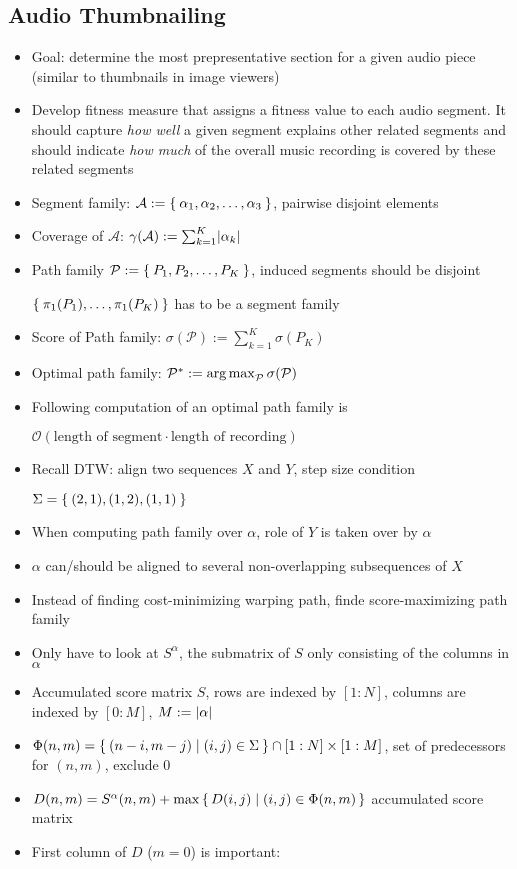 \subsection{Audio Thumbnailing}
\begin{itemize}
	\item
		Goal: determine the most prepresentative section for a given audio piece (similar to thumbnails in image viewers)
	\item
		Develop fitness measure that assigns a fitness value to each audio segment. It should capture \textit{how well} a given segment explains other related segments and should indicate \textit{how much} of the overall music recording is covered by these related segments
	\item
		Segment family: $\mathcal{A} := \Set{\alpha_1, \alpha_2, \dots , \alpha_3}$, pairwise disjoint elements
	\item
		Coverage of $\mathcal{A}$: $\gamma(\mathcal{A}) := \sum_{k=1}^K \lvert\alpha_k\rvert$
	\item
		Path family $\mathcal{P} := \Set{P_1, P_2, \dots, P_K}$, induced segments should be disjoint 
		
		$\Set{\pi_1(P_1), \dots, \pi_1(P_K)}$ has to be a segment family
	\item
		Score of Path family: $\sigma(\mathcal{P}):= \sum_{k=1}^K \sigma(P_K)$
	\item
		Optimal path family: $\mathcal{P}^* := \operatorname*{arg\,max}_{\mathcal{P}} \sigma(\mathcal{P})$
	\item
		Following computation of an optimal path family is 
		
		$\mathcal{O}(\text{length of segment} \cdot \text{length of recording})$
	\item
		Recall DTW: align two sequences $X$ and $Y$, step size condition 
		
		$\Sigma = \Set{(2,1), (1,2), (1,1)}$
	\item
		When computing path family over $\alpha$, role of $Y$ is taken over by $\alpha$
	\item
		$\alpha$ can/should be aligned to several non-overlapping subsequences of $X$
	\item
		Instead of finding cost-minimizing warping path, finde score-maximizing path family
	\item
		Only have to look at $S^\alpha$, the submatrix of $S$ only consisting of the columns in $\alpha$
	\item
		Accumulated score matrix $S$, rows are indexed by $[1:N]$, columns are indexed by $[0:M]$, $M:= \lvert\alpha\rvert$
	\item
		$\Phi(n,m) = \Set{(n-i, m-j) | (i,j) \in \Sigma} \cap [1:N] \times [1:M]$, set of predecessors for $(n,m)$, exclude 0
	\item
		$D(n,m) = S^\alpha(n,m) + \max \set{D(i,j) | (i,j) \in \Phi(n,m)}$  accumulated score matrix
	\item
		First column of $D$ ($m= 0$) is important:


\end{itemize}
